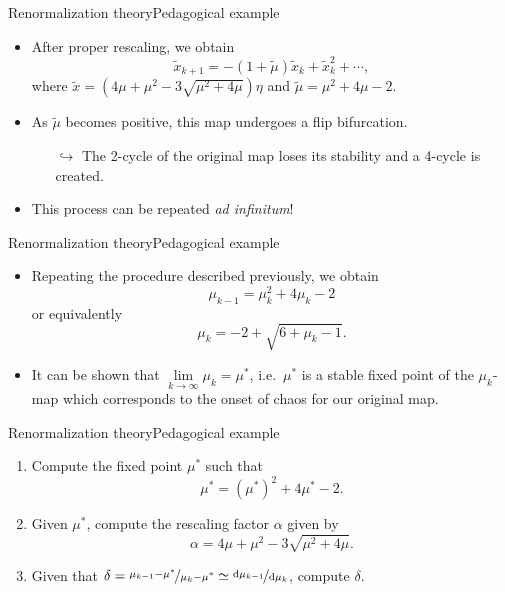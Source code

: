 \documentclass[usenames,dvipsnames,svgnames,10pt,aspectratio=169]{beamer}
\begin{document}
\begin{frame}[t, c]{Renormalization theory}{Pedagogical example}
	\begin{itemize}
		\item After proper rescaling, we obtain
		$$\tilde{x}_{k+1} = -(1 + \tilde{\mu}) \tilde{x}_k + \tilde{x}_k^2 + \cdots,$$
		where $\tilde{x} = (4 \mu + \mu^2 - 3\sqrt{\mu^2 + 4\mu}) \eta$ and $\tilde{\mu} = \mu^2 + 4\mu - 2$.

		\bigskip

		\item As $\tilde{\mu}$ becomes positive, this map undergoes a flip bifurcation.
		\begin{itemize}
			\item[$\hookrightarrow$] The 2-cycle of the original map loses its stability and a 4-cycle is created.
		\end{itemize}

		\bigskip

		\item This process can be repeated \emph{ad infinitum}!
	\end{itemize}

	\vspace{1cm}
\end{frame}

\begin{frame}[t, c]{Renormalization theory}{Pedagogical example}
	\begin{itemize}
		\item Repeating the procedure described previously, we obtain
		$$\mu_{k-1} = \mu_k^2 + 4\mu_k - 2$$
		or equivalently
		$$\mu_k = -2 + \sqrt{6 + \mu_k-1}.$$

		\bigskip

		\item It can be shown that $\lim \limits_{k \to \infty} \mu_k = \mu^*$, i.e.\ $\mu^*$ is a stable fixed point of the $\mu_k$-map which corresponds to the onset of chaos for our original map.
	\end{itemize}

	\vspace{1cm}
\end{frame}

\begin{frame}[t, c]{Renormalization theory}{Pedagogical example}
	\begin{enumerate}
		\item Compute the fixed point $\mu^*$ such that
		$$\mu^* = \left( \mu^* \right)^2 + 4\mu^* -2.$$

		\item Given $\mu^*$, compute the rescaling factor $\alpha$ given by
		$$\alpha = 4\mu + \mu^2 - 3\sqrt{\mu^2 + 4\mu}.$$

		\bigskip

		\item Given that $\delta = \nicefrac{\mu_{k-1} - \mu^*}{\mu_k - \mu^*} \simeq \nicefrac{\mathrm{d}\mu_{k-1}}{\mathrm{d}\mu_k}$, compute $\delta$.
	\end{enumerate}

	\vspace{1cm}
\end{frame}
\end{document}
